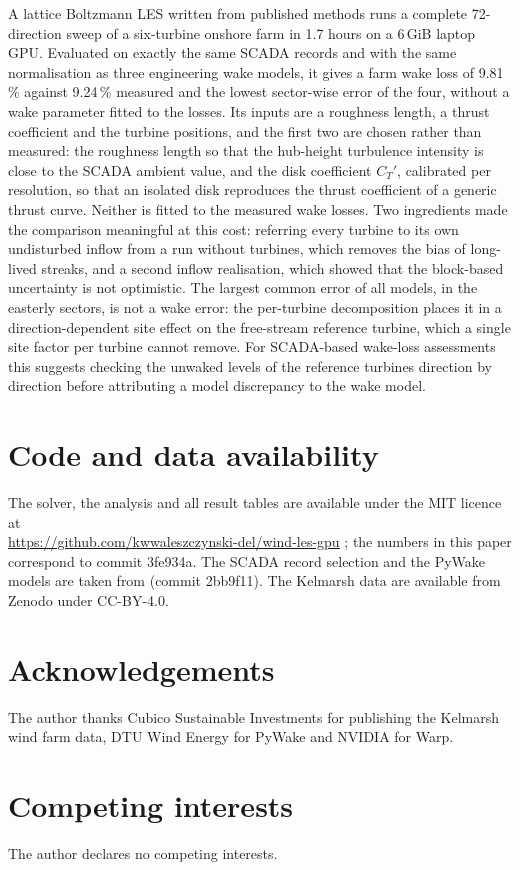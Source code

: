 \documentclass[11pt,a4paper]{article}
\begin{document}
A lattice Boltzmann LES written from published methods runs a complete 72-direction sweep of a six-turbine onshore
farm in 1.7 hours on a 6\,GiB laptop GPU. Evaluated on exactly the same SCADA records and with the same
normalisation as three engineering wake models, it gives a farm wake loss of 9.81\,\% against 9.24\,\% measured and
the lowest sector-wise error of the four, without a wake parameter fitted to the losses. Its inputs are a
roughness length, a thrust coefficient and the turbine positions, and the first two are chosen rather than
measured: the roughness length so that the hub-height turbulence intensity is close to the SCADA ambient value,
and the disk coefficient $C_T'$, calibrated per resolution, so that an isolated disk reproduces the thrust
coefficient of a generic thrust curve. Neither is fitted to the measured wake losses. Two ingredients made the
comparison meaningful at this cost: referring every turbine to its own undisturbed inflow from a run without
turbines, which removes the bias of long-lived streaks, and a second inflow realisation, which showed that the
block-based uncertainty is not optimistic. The largest common error of all models, in the easterly sectors, is not
a wake error: the per-turbine decomposition places it in a direction-dependent site effect on the free-stream
reference turbine, which a single site factor per turbine cannot remove. For SCADA-based wake-loss assessments
this suggests checking the unwaked levels of the reference turbines direction by direction before attributing a
model discrepancy to the wake model.

\section*{Code and data availability}

The solver, the analysis and all result tables are available under the MIT licence at\\
\url{https://github.com/kwwaleszczynski-del/wind-les-gpu} \citep{waleszczynski2026windles}; the numbers in this
paper correspond to commit 3fe934a. The SCADA record selection and the PyWake models are
taken from \citet{waleszczynski2026wakeshadow} (commit 2bb9f11). The Kelmarsh data are available from Zenodo
\citep{plumley2025kelmarsh} under CC-BY-4.0.

\section*{Acknowledgements}

The author thanks Cubico Sustainable Investments for publishing the Kelmarsh wind farm data, DTU Wind Energy for
PyWake and NVIDIA for Warp.

\section*{Competing interests}

The author declares no competing interests.



\end{document}
